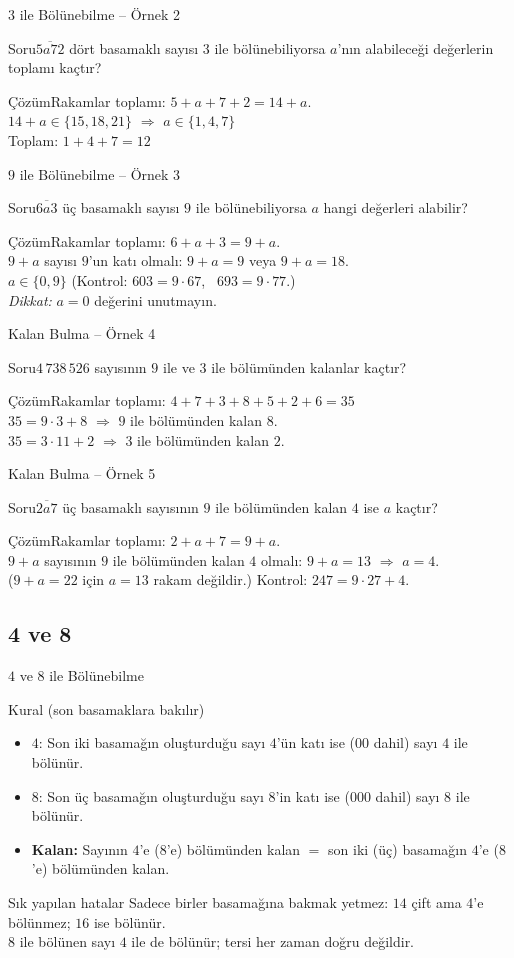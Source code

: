 \documentclass[aspectratio=169,11pt]{beamer}
\newcommand{\soru}[3]{%
\begin{frame}{#1}
  \begin{block}{Soru}\large #2\end{block}
  \pause
  \begin{exampleblock}{Çözüm}\large #3\end{exampleblock}
\end{frame}}
\newcommand{\ab}[1]{\overline{#1}}
\begin{document}
\soru{\(3\) ile Bölünebilme -- Örnek 2}
{\(\ab{5a72}\) dört basamaklı sayısı \(3\) ile bölünebiliyorsa \(a\)'nın alabileceği değerlerin toplamı kaçtır?}
{Rakamlar toplamı: \(5+a+7+2=14+a\).\\[3pt]
\(14+a\in\{15,18,21\}\) \(\Rightarrow\) \(a\in\{1,4,7\}\)\\[3pt]
Toplam: \(1+4+7=12\)}

\soru{\(9\) ile Bölünebilme -- Örnek 3}
{\(\ab{6a3}\) üç basamaklı sayısı \(9\) ile bölünebiliyorsa \(a\) hangi değerleri alabilir?}
{Rakamlar toplamı: \(6+a+3=9+a\).\\[3pt]
\(9+a\) sayısı \(9\)'un katı olmalı: \(9+a=9\) veya \(9+a=18\).\\[3pt]
\(a\in\{0,9\}\) \quad (Kontrol: \(603=9\cdot 67\), \ \(693=9\cdot 77\).)\\[3pt]
\textit{Dikkat:} \(a=0\) değerini unutmayın.}

\soru{Kalan Bulma -- Örnek 4}
{\(4\,738\,526\) sayısının \(9\) ile ve \(3\) ile bölümünden kalanlar kaçtır?}
{Rakamlar toplamı: \(4+7+3+8+5+2+6=35\)\\[3pt]
\(35=9\cdot 3+8\) \(\Rightarrow\) \(9\) ile bölümünden kalan \(8\).\\[3pt]
\(35=3\cdot 11+2\) \(\Rightarrow\) \(3\) ile bölümünden kalan \(2\).}

\soru{Kalan Bulma -- Örnek 5}
{\(\ab{2a7}\) üç basamaklı sayısının \(9\) ile bölümünden kalan \(4\) ise \(a\) kaçtır?}
{Rakamlar toplamı: \(2+a+7=9+a\).\\[3pt]
\(9+a\) sayısının \(9\) ile bölümünden kalan \(4\) olmalı: \(9+a=13\) \(\Rightarrow\) \(a=4\).\\[3pt]
(\(9+a=22\) için \(a=13\) rakam değildir.) \quad Kontrol: \(247=9\cdot 27+4\).}

\subsection{4 ve 8}
\begin{frame}{\(4\) ve \(8\) ile Bölünebilme}
\begin{block}{Kural (son basamaklara bakılır)}
\begin{itemize}
\item \(4\): Son iki basamağın oluşturduğu sayı \(4\)'ün katı ise (\(00\) dahil) sayı \(4\) ile bölünür.
\item \(8\): Son üç basamağın oluşturduğu sayı \(8\)'in katı ise (\(000\) dahil) sayı \(8\) ile bölünür.
\item \textbf{Kalan:} Sayının \(4\)'e (\(8\)'e) bölümünden kalan \(=\) son iki (üç) basamağın \(4\)'e (\(8\)'e) bölümünden kalan.
\end{itemize}
\end{block}
\begin{alertblock}{Sık yapılan hatalar}
Sadece birler basamağına bakmak yetmez: \(14\) çift ama \(4\)'e bölünmez; \(16\) ise bölünür.\\
\(8\) ile bölünen sayı \(4\) ile de bölünür; tersi her zaman doğru değildir.
\end{alertblock}
\end{frame}
\end{document}
